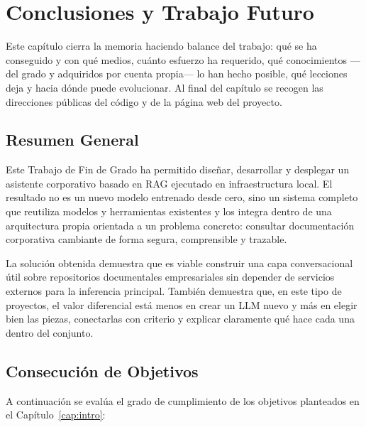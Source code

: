\chapter{Conclusiones y Trabajo Futuro}
\label{cap:conclusiones}

Este capítulo cierra la memoria haciendo balance del trabajo: qué se ha conseguido y con qué medios, cuánto esfuerzo ha requerido, qué conocimientos ---del grado y adquiridos por cuenta propia--- lo han hecho posible, qué lecciones deja y hacia dónde puede evolucionar. Al final del capítulo se recogen las direcciones públicas del código y de la página web del proyecto.

\section{Resumen General}

Este Trabajo de Fin de Grado ha permitido diseñar, desarrollar y desplegar un asistente corporativo basado en RAG ejecutado en infraestructura local. El resultado no es un nuevo modelo entrenado desde cero, sino un sistema completo que reutiliza modelos y herramientas existentes y los integra dentro de una arquitectura propia orientada a un problema concreto: consultar documentación corporativa cambiante de forma segura, comprensible y trazable.

La solución obtenida demuestra que es viable construir una capa conversacional útil sobre repositorios documentales empresariales sin depender de servicios externos para la inferencia principal. También demuestra que, en este tipo de proyectos, el valor diferencial está menos en crear un LLM nuevo y más en elegir bien las piezas, conectarlas con criterio y explicar claramente qué hace cada una dentro del conjunto.

\section{Consecución de Objetivos}

A continuación se evalúa el grado de cumplimiento de los objetivos planteados en el Capítulo~\ref{cap:intro}:

